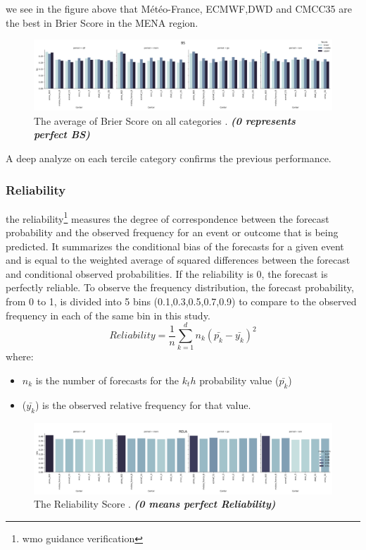 we see in the figure above that Météo-France, ECMWF,DWD and CMCC35 are the best in Brier Score in the MENA region.





\begin{figure}[H]
    \centering
    \includegraphics[scale=0.3]{bs.png}
    \caption{The average of  Brier Score on all categories    . \textbf{\textit{(0 represents perfect BS)}}}
\end{figure}
A deep analyze on each tercile category confirms the previous performance.



\subsubsection{Reliability}
the reliability\footnote{wmo guidance verification} measures the degree of correspondence between the forecast probability and the observed frequency for an event or outcome that is being predicted. It summarizes the conditional bias of the forecasts for a given event and is equal to the weighted average of squared differences between the forecast and conditional observed probabilities. If the reliability is 0, the forecast is perfectly reliable. To observe the frequency distribution, the forecast probability, from 0 to 1, is divided into 5 bins (0.1,0.3,0.5,0.7,0.9) to compare to the observed frequency in each of the same bin in this study. 
$$Reliability=\frac{1}{n} \sum\limits_{k=1}^{d} n_k(\bar{p_k}-\bar{y_k})^2$$
where:
\begin{itemize}
	\item $n_k$ is the number of forecasts for the $k_th$ probability value ($\bar{p_k}$)
	\item ($\bar{y_k}$) is the observed relative frequency for that value.
\end{itemize} 

\begin{figure}[H]
    \centering
    \includegraphics[scale=0.3]{rela_all.png}
    \caption{The Reliability Score  . \textbf{\textit{(0 means perfect Reliability)}}}
\end{figure}

